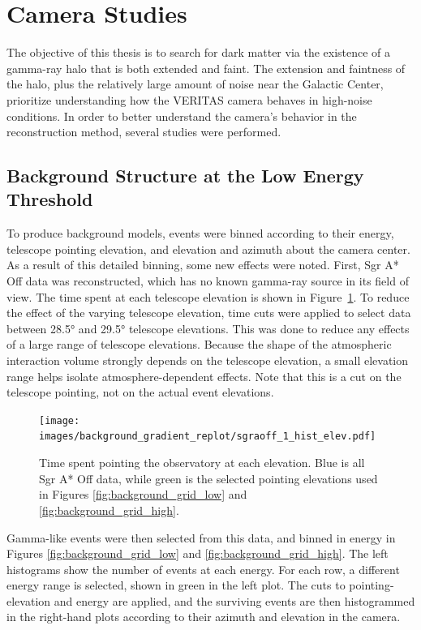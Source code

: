   \FloatBarrier

\section{Camera Studies}
The objective of this thesis is to search for dark matter via the existence of a gamma-ray halo that is both extended and faint.
The extension and faintness of the halo, plus the relatively large amount of noise near the Galactic Center, prioritize understanding how the VERITAS camera behaves in high-noise conditions.
In order to better understand the camera's behavior in the reconstruction method, several studies were performed.

\subsection{Background Structure at the Low Energy Threshold}\label{subsec:bkgstructure}
To produce background models, events were binned according to their energy, telescope pointing elevation, and elevation and azimuth about the camera center.
As a result of this detailed binning, some new effects were noted.
First, Sgr A* Off data was reconstructed, which has no known gamma-ray source in its field of view.
The time spent at each telescope elevation is shown in Figure~\ref{fig:back_elevhist}.
To reduce the effect of the varying telescope elevation, time cuts were applied to select data between \ang{28.5} and \ang{29.5} telescope elevations.
This was done to reduce any effects of a large range of telescope elevations.
Because the shape of the atmospheric interaction volume strongly depends on the telescope elevation, a small elevation range helps isolate atmosphere-dependent effects.
Note that this is a cut on the telescope pointing, not on the actual event elevations.

\begin{figure}[bt]
  \centering
  \texttt{[image: images/background\_gradient\_replot/sgraoff\_1\_hist\_elev.pdf]}
  \caption[Elevation Slice of Sgr A* Off Data]{
    Time spent pointing the observatory at each elevation.
    Blue is all Sgr A* Off data, while green is the selected pointing elevations used in Figures \ref{fig:background_grid_low} and \ref{fig:background_grid_high}.
  }
  \label{fig:back_elevhist}
\end{figure}
    
Gamma-like events were then selected from this data, and binned in energy in Figures \ref{fig:background_grid_low} and \ref{fig:background_grid_high}.
The left histograms show the number of events at each energy.
For each row, a different energy range is selected, shown in green in the left plot.
The cuts to pointing-elevation and energy are applied, and the surviving events are then histogrammed in the right-hand plots according to their azimuth and elevation in the camera.
    
